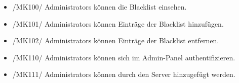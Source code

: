 \begin{itemize}
\begin{itemize}
            \item{/MK94/} \label{/MK94/}Welche \Glspl{Alias} hat das Gebäude/der Raum? \ref{/FA80/}
        \end{itemize}
    \item{/MK100/} \label{/MK100/}\Glspl{Administrator} können die \Gls{Blacklist} einsehen.
    \item{/MK101/} \label{/MK101/}\Glspl{Administrator} können Einträge der \Gls{Blacklist} hinzufügen.
    \item{/MK102/} \label{/MK102/}\Glspl{Administrator} können Einträge der \Gls{Blacklist} entfernen.
    \item{/MK110/} \label{/MK110/}\Glspl{Administrator} können sich im \Gls{Admin-Panel} authentifizieren.
    \item{/MK111/} \label{/MK111/}\Glspl{Administrator} können durch den Server hinzugefügt werden.

\end{itemize}
